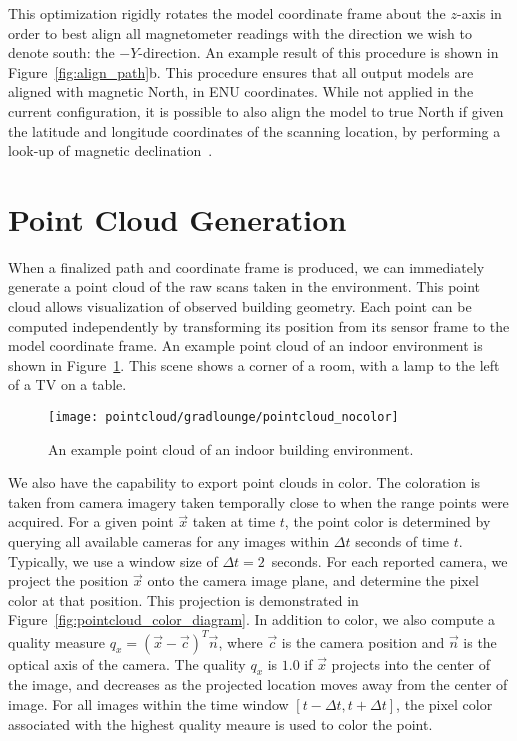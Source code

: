 \documentclass[12pt,onecolumn,oneside]{book}
\begin{document}
This optimization rigidly rotates the model coordinate frame about the $z$-axis in order to best align all magnetometer readings with the direction we wish to denote south:  the $-Y$-direction.  An example result of this procedure is shown in Figure~\ref{fig:align_path}b.  This procedure ensures that all output models are aligned with magnetic North, in ENU coordinates.  While not applied in the current configuration, it is possible to also align the model to true North if given the latitude and longitude coordinates of the scanning location, by performing a look-up of magnetic declination~\cite{MagDec}.

\section{Point Cloud Generation}
\label{sec:pointcloud}

When a finalized path and coordinate frame is produced, we can immediately generate a point cloud of the raw scans taken in the environment.  This point cloud allows visualization of observed building geometry.  Each point can be computed independently by transforming its position from its sensor frame to the model coordinate frame.  An example point cloud of an indoor environment is shown in Figure~\ref{fig:pointcloud_nocolor}.  This scene shows a corner of a room, with a lamp to the left of a TV on a table.

\begin{figure}
	\centerline{\texttt{[image: pointcloud/gradlounge/pointcloud\_nocolor]}}
	\caption{An example point cloud of an indoor building environment.}
	\label{fig:pointcloud_nocolor}
\end{figure}

We also have the capability to export point clouds in color.  The coloration is taken from camera imagery taken temporally close to when the range points were acquired.  For a given point $\vec{x}$ taken at time $t$, the point color is determined by querying all available cameras for any images within $\Delta t$ seconds of time $t$.  Typically, we use a window size of $\Delta t = 2$~seconds.  For each reported camera, we project the position $\vec{x}$ onto the camera image plane, and determine the pixel color at that position.  This projection is demonstrated in Figure~\ref{fig:pointcloud_color_diagram}.  In addition to color, we also compute a quality measure $q_x = (\vec{x} - \vec{c})^T \vec{n}$, where $\vec{c}$ is the camera position and $\vec{n}$ is the optical axis of the camera.  The quality $q_x$ is $1.0$ if $\vec{x}$ projects into the center of the image, and decreases as the projected location moves away from the center of image.  For all images within the time window $[t - \Delta t, t + \Delta t]$, the pixel color associated with the highest quality meaure is used to color the point.
\end{document}

